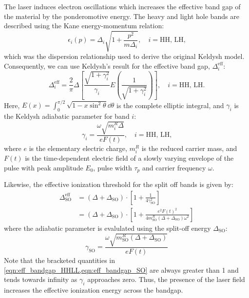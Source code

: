 The laser induces electron oscillations which increases the effective band gap of the material by the ponderomotive energy. The heavy and light hole bands are described using the Kane energy-momentum relation:
\begin{equation}
\epsilon_i(p) = \Delta_i \sqrt{1+\frac{p^2}{m \Delta_i}}, \quad i = \textrm{HH, LH,}
\end{equation}
which was the dispersion relationship used to derive the original Keldysh model. Consequently, we can use Keldysh's result for the effective band gap, $\Delta_i^{\textrm{eff}}$:
\begin{equation}
\Delta_i^{\textrm{eff}} = \frac{2}{\pi} \Delta \left[ \frac{\sqrt{1+\gamma_i^2}}{\gamma_i} E\left(\frac{1}{\sqrt{1+\gamma_i^2}}\right) \right], \quad i = \textrm{HH, LH.}
\label{eqn:eff_bandgap_HHLL}
\end{equation}
Here, $E(x) = \int_{0}^{\pi/2} \sqrt{1 - x \sin^2 \theta} \dd{\theta}$ is the complete elliptic integral, and $\gamma_i$ is the Keldysh adiabatic parameter for band $i$:
\begin{equation}
\gamma_i = \frac{\omega \sqrt{m_i^R \Delta}}{e F(t)}, \quad i = \textrm{HH, LH,}
\end{equation}
where $e$ is the elementary electric charge, $m_i^R$ is the reduced carrier mass, and $F(t)$ is the time-dependent electric field of a slowly varying envelope of the pulse with peak amplitude $E_0$, pulse width $\tau_p$ and carrier frequency $\omega$.

Likewise, the effective ionization threshold for the split off bands is given by:
\begin{equation}
\begin{aligned}
\Delta_{\textrm{SO}}^{\textrm{eff}} &= (\Delta + \Delta_{\textrm{SO}}) \cdot \left[ 1 + \frac{1}{4 \gamma^2_{\textrm{SO}}} \right] \\
&= (\Delta + \Delta_{\textrm{SO}}) \cdot \left[1 + \frac{e^2 F(t)^2}{4 m_{\textrm{SO}}^R (\Delta + \Delta_{\textrm{SO}}) \omega^2} \right]
\end{aligned}
\label{eqn:eff_bandgap_SO}
\end{equation}
where the adiabatic parameter is evalulated using the split-off energy $\Delta_{\textrm{SO}}$:
\begin{equation}
\gamma_{\textrm{SO}} = \frac{\omega \sqrt{m_{\textrm{SO}}^R (\Delta + \Delta_{\textrm{SO}})}}{e F(t)}
\end{equation}
Note that the bracketed quantities in \cref{eqn:eff_bandgap_HHLL,eqn:eff_bandgap_SO} are always greater than 1 and tends towards infinity as $\gamma_i$ approaches zero. Thus, the presence of the laser field increases the effective ionization energy across the bandgap.


